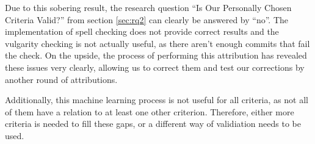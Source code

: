 Due to this sobering result, the research question ``Is Our Personally Chosen Criteria Valid?'' from section \ref{sec:rq2} can clearly be answered by ``no''. The implementation of spell checking does not provide correct results and the vulgarity checking is not actually useful, as there aren't enough commits that fail the check. On the upside, the process of performing this attribution has revealed these issues very clearly, allowing us to correct them and test our corrections by another round of attributions.

Additionally, this machine learning process is not useful for all criteria, as not all of them have a relation to at least one other criterion. Therefore, either more criteria is needed to fill these gaps, or a different way of validiation needs to be used.


%
%
